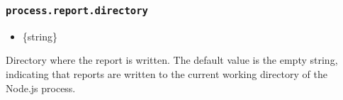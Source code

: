 \begin{Shaded}
\begin{Highlighting}[]
 \OperatorTok{;}

\NormalTok{(}\SpecialCharTok{$\{}\SpecialCharTok{\}}\VerbatimStringTok{\textasciigrave{}}\NormalTok{)}\OperatorTok{;}
\end{Highlighting}
\end{Shaded}

\begin{Shaded}
\begin{Highlighting}[]
\OperatorTok{=} \NormalTok{(}\NormalTok{)}\OperatorTok{;}

\NormalTok{(}\SpecialCharTok{$\{}\SpecialCharTok{\}}\VerbatimStringTok{\textasciigrave{}}\NormalTok{)}\OperatorTok{;}
\end{Highlighting}
\end{Shaded}

\subsubsection{\texorpdfstring{\texttt{process.report.directory}}{process.report.directory}}\label{process.report.directory}

\begin{itemize}
\tightlist
\item
  \{string\}
\end{itemize}

Directory where the report is written. The default value is the empty
string, indicating that reports are written to the current working
directory of the Node.js process.

\begin{Shaded}
\begin{Highlighting}[]
 \OperatorTok{;}

\NormalTok{(}\SpecialCharTok{$\{}\SpecialCharTok{\}}\VerbatimStringTok{\textasciigrave{}}\NormalTok{)}\OperatorTok{;}
\end{Highlighting}
\end{Shaded}

